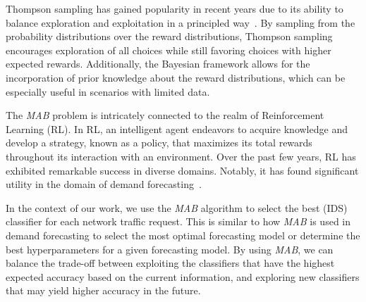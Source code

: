 Thompson sampling has gained popularity in recent years due to its ability to balance exploration and exploitation in a
principled way~\cite{park2021analysis}.
By sampling from the probability distributions over the reward distributions, Thompson sampling encourages exploration
of all choices while still favoring choices with higher expected rewards.
Additionally, the Bayesian framework allows for the incorporation of prior knowledge about the reward distributions,
which can be especially useful in scenarios with limited data.

The \textit{MAB} problem is intricately connected to the realm of Reinforcement Learning (RL).
In RL, an intelligent agent endeavors to acquire knowledge and develop a strategy, known as a policy, that maximizes
its total rewards throughout its interaction with an environment.
Over the past few years, RL has exhibited remarkable success in diverse domains.
Notably, it has found significant utility in the domain of demand forecasting~\cite{ramos2022selection, ramos2022learning}.

In the context of our work, we use the \textit{MAB} algorithm to select the best (IDS) classifier for each network traffic
request. 
This is similar to how \textit{MAB} is used in demand forecasting to select the most optimal forecasting model or determine
the best hyperparameters for a given forecasting model.
By using \textit{MAB}, we can balance the trade-off between exploiting the classifiers that have the highest expected
accuracy based on the current information, and exploring new classifiers that may yield higher accuracy in the future.